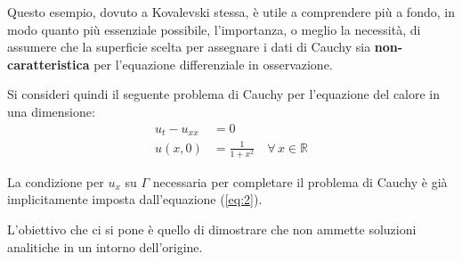 \begin{example}

Questo esempio, dovuto a Kovalevski stessa, è utile a comprendere più a fondo, in modo quanto più essenziale possibile, l'importanza, o meglio la necessità, di assumere che la superficie scelta per assegnare i dati di Cauchy sia \textbf{non-caratteristica} per l'equazione differenziale in osservazione.
 
Si consideri quindi il seguente problema di Cauchy per l'equazione del calore in una dimensione:
\begin{align} 
\label{eq:1}
u_t-u_{xx}&=0\\ 
\label{eq:2}
u(x,0)&=\frac{1}{1+x^2} \quad \forall \, x \in \mathbb{R}
\end{align}
\begin{remark}
La condizione per $u_x$ su $\Gamma$ necessaria per completare il problema di Cauchy è già implicitamente imposta dall'equazione
(\ref{eq:2}).
\end{remark}
L'obiettivo che ci si pone è quello di dimostrare che non ammette soluzioni analitiche in un intorno dell'origine.


\end{example}
